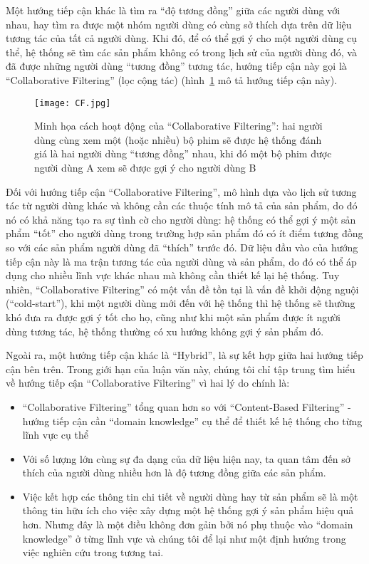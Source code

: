 Một hướng tiếp cận khác là tìm ra ``độ tương đồng'' giữa các người dùng với nhau, hay tìm ra được một nhóm người dùng
có cùng sở thích dựa trên dữ liệu tương tác của tất cả người dùng. Khi đó, để có thể gợi ý cho một người dùng cụ thể,
hệ thống sẽ tìm các sản phẩm không có trong lịch sử của người dùng đó, và đã được những người dùng ``tương đồng'' tương tác,
hướng tiếp cận này gọi là ``Collaborative Filtering'' (lọc cộng tác) (hình~\ref{fig_CF} mô tả hướng tiếp cận này).
\begin{figure}
    \centering
    \texttt{[image: CF.jpg]}
    \caption{Minh họa cách hoạt động của ``Collaborative Filtering'': hai người dùng cùng xem một (hoặc nhiều) bộ phim 
    sẽ được hệ thống đánh giá là hai người dùng ``tương đồng'' nhau, khi đó một bộ phim được
    người dùng A xem sẽ được gợi ý cho người dùng B}
    \label{fig_CF}
\end{figure}
Đối với hướng tiếp cận ``Collaborative Filtering'', mô hình dựa vào lịch sử tương tác từ người dùng khác
và không cần các thuộc tính mô tả của sản phẩm, do đó nó có khả năng tạo ra sự tình cờ cho người dùng:
hệ thống có thể gợi ý một sản phẩm ``tốt'' cho người dùng trong trường hợp sản phẩm đó có ít điểm tương đồng
so với các sản phẩm người dùng đã ``thích'' trước đó. Dữ liệu đầu vào của hướng tiếp cận này là ma trận tương tác
của người dùng và sản phẩm, do đó có thể áp dụng cho nhiều lĩnh vực khác nhau mà không cần thiết kế lại hệ thống.
Tuy nhiên, ``Collaborative Filtering'' có một vấn đề tồn tại là vấn đề khởi động nguội (``cold-start''),
khi một người dùng mới đến với hệ thống thì hệ thống sẽ thường khó đưa ra được gợi ý tốt cho họ,
cũng như khi một sản phẩm được ít người dùng tương tác, hệ thống thường có xu hướng không gợi ý sản phẩm đó.

Ngoài ra, một hướng tiếp cận khác là ``Hybrid'', là sự kết hợp giữa hai hướng tiếp cận bên trên.
Trong giới hạn của luận văn này, chúng tôi chỉ tập trung tìm hiểu về hướng tiếp cận ``Collaborative Filtering''
vì hai lý do chính là:
\begin{itemize}
\item ``Collaborative Filtering'' tổng quan hơn so với ``Content-Based Filtering''
- hướng tiếp cận cần ``domain knowledge'' cụ thể để thiết kế hệ thống cho từng lĩnh vực cụ thể
\item Với số lượng lớn cùng sự đa dạng của dữ liệu hiện nay,
ta quan tâm đến sở thích của người dùng nhiều hơn là độ tương đồng giữa các sản phẩm.
\item Việc kết hợp các thông tin chi tiết về người dùng hay từ sản phẩm sẽ là một thông tin hữu ích cho việc xây dựng một hệ thống gợi ý sản phẩm hiệu quả hơn. Nhưng đây là một điều không đơn gảin bởi nó phụ thuộc vào ``domain knowledge'' ở từng lĩnh vực và chúng tôi để lại như một định hướng trong việc nghiên cứu trong tương tai.
\end{itemize}

